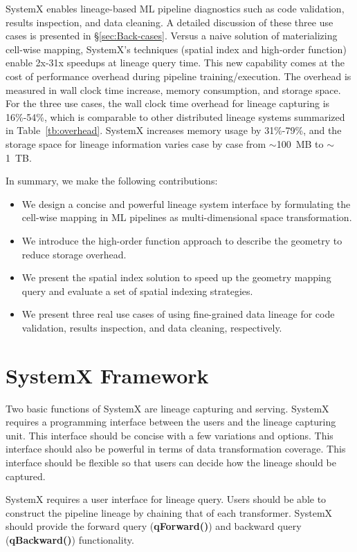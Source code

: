 \documentclass{sig-alternate}
\newenvironment{shortlist}{
        \vspace*{-0.5em}
  \begin{itemize}
  \setlength{\itemsep}{-0.1em}
}{
  \end{itemize}
        \vspace*{-0.5em}
}
\begin{document}
SystemX enables lineage-based ML pipeline diagnostics such as code validation, results inspection, and data cleaning.
A detailed discussion of these three use cases is presented in \S\ref{sec:Back-cases}.
Versus a naive solution of materializing cell-wise mapping, 
SystemX's techniques (spatial index and high-order function) enable 2x-31x speedups at lineage query time.
This new capability comes at the cost of performance overhead during pipeline training/execution.
The overhead is measured in wall clock time increase, memory consumption, and storage space.
For the three use cases, the wall clock time overhead for lineage capturing is 16\%-54\%, which is comparable to other distributed lineage systems
summarized in Table~\ref{tb:overhead}.
SystemX increases memory usage by 31\%-79\%,
and the storage space for lineage information varies case by case from $\sim$100~MB to $\sim$1~TB.


In summary, we make the following contributions:
\begin{shortlist}
\item{} We design a concise and powerful lineage system interface by formulating the cell-wise mapping in ML pipelines as multi-dimensional space transformation.
\item{} We introduce the high-order function approach to describe the geometry to reduce storage overhead.
\item{} We present the spatial index solution to speed up the geometry mapping query and evaluate a set of spatial indexing strategies.
\item{} We present three real use cases of using fine-grained data lineage for code validation, results inspection, and data cleaning, respectively.
\end{shortlist}

\section{S\MakeLowercase{ystem}X Framework}
\label{sec:functional}
Two basic functions of SystemX are lineage capturing and serving.
SystemX requires a programming interface between the users and the lineage capturing unit. 
This interface should be concise with a few variations and options.
This interface should also be powerful in terms of data transformation coverage.
This interface should be flexible so that users can decide how the lineage should be captured.

SystemX requires a user interface for lineage query.
Users should be able to construct the pipeline lineage by chaining that of each transformer.
SystemX should provide the forward query ({\bf qForward()}) and backward query ({\bf qBackward()}) functionality.
\end{document}
